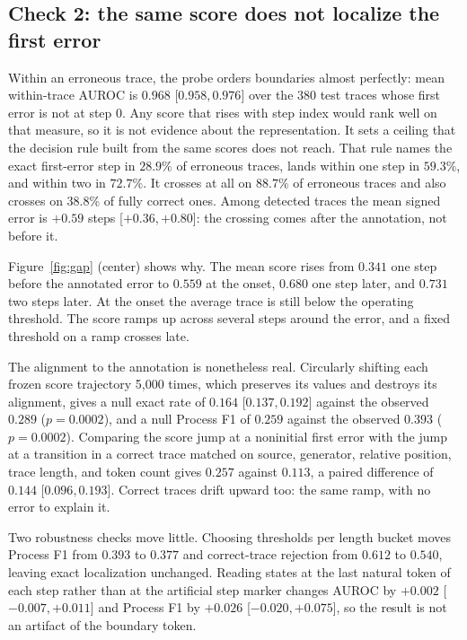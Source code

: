 \documentclass{article}
\begin{document}
\subsection{Check 2: the same score does not localize the first error}

Within an erroneous trace, the probe orders boundaries almost perfectly: mean within-trace AUROC is
$0.968$ [$0.958,0.976$] over the 380 test traces whose first error is not at step 0. Any score that
rises with step index would rank well on that measure, so it is not evidence about the
representation. It sets a ceiling that the decision rule built from the same scores does not reach.
That rule names the exact first-error step in $28.9\%$ of erroneous traces, lands within one step in
$59.3\%$, and within two in $72.7\%$. It crosses at all on $88.7\%$ of erroneous traces and also
crosses on $38.8\%$ of fully correct ones. Among detected traces the mean signed error is $+0.59$
steps [$+0.36,+0.80$]: the crossing comes after the annotation, not before it.

Figure~\ref{fig:gap} (center) shows why. The mean score rises from $0.341$ one step before the
annotated error to $0.559$ at the onset, $0.680$ one step later, and $0.731$ two steps later. At
the onset the average trace is still below the operating threshold. The score ramps up across
several steps around the error, and a fixed threshold on a ramp crosses late.

The alignment to the annotation is nonetheless real. Circularly shifting each frozen score
trajectory 5{,}000 times, which preserves its values and destroys its alignment, gives a null exact
rate of $0.164$ [$0.137,0.192$] against the observed $0.289$ ($p=0.0002$), and a null Process F1 of
$0.259$ against the observed $0.393$ ($p=0.0002$). Comparing the score jump at a noninitial first
error with the jump at a transition in a correct trace matched on source, generator, relative
position, trace length, and token count gives $0.257$ against $0.113$, a paired difference of
$0.144$ [$0.096,0.193$]. Correct traces drift upward too: the same ramp, with no error to explain
it.

Two robustness checks move little. Choosing thresholds per length bucket moves Process F1 from
$0.393$ to $0.377$ and correct-trace rejection from $0.612$ to $0.540$, leaving exact localization
unchanged. Reading states at the last natural token of each step rather than at the artificial step
marker changes AUROC by $+0.002$ [$-0.007,+0.011$] and Process F1 by $+0.026$ [$-0.020,+0.075$], so
the result is not an artifact of the boundary token.
\end{document}
